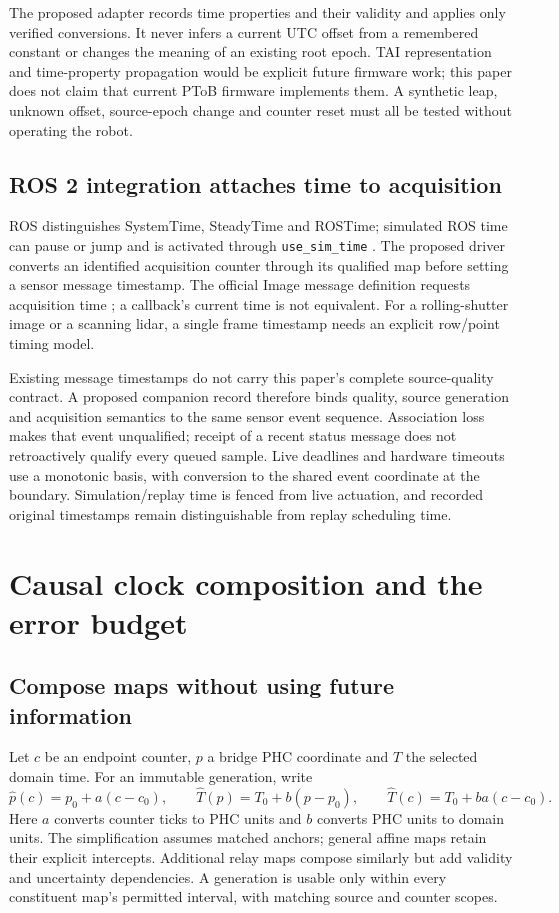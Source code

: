 \documentclass[11pt,letterpaper]{article}
\newcommand{\code}[1]{\texttt{#1}}
\begin{document}
The proposed adapter records time properties and their validity and applies only verified conversions. It never infers a current UTC offset from a remembered constant or changes the meaning of an existing root epoch. TAI representation and time-property propagation would be explicit future firmware work; this paper does not claim that current PToB firmware implements them. A synthetic leap, unknown offset, source-epoch change and counter reset must all be tested without operating the robot.

\subsection{ROS 2 integration attaches time to acquisition}
ROS distinguishes SystemTime, SteadyTime and ROSTime; simulated ROS time can pause or jump and is activated through \code{use\_sim\_time} \cite{rosclock}. The proposed driver converts an identified acquisition counter through its qualified map before setting a sensor message timestamp. The official Image message definition requests acquisition time \cite{rosimage}; a callback's current time is not equivalent. For a rolling-shutter image or a scanning lidar, a single frame timestamp needs an explicit row/point timing model.

Existing message timestamps do not carry this paper's complete source-quality contract. A proposed companion record therefore binds quality, source generation and acquisition semantics to the same sensor event sequence. Association loss makes that event unqualified; receipt of a recent status message does not retroactively qualify every queued sample. Live deadlines and hardware timeouts use a monotonic basis, with conversion to the shared event coordinate at the boundary. Simulation/replay time is fenced from live actuation, and recorded original timestamps remain distinguishable from replay scheduling time.

\section{Causal clock composition and the error budget}\label{sec:budget}
\subsection{Compose maps without using future information}
Let $c$ be an endpoint counter, $p$ a bridge PHC coordinate and $T$ the selected domain time. For an immutable generation, write
\begin{equation}
 \widehat p(c)=p_0+a(c-c_0),\qquad
 \widehat T(p)=T_0+b(p-p_0),\qquad
 \widehat T(c)=T_0+ba(c-c_0).
 \label{eq:compose}
\end{equation}
Here $a$ converts counter ticks to PHC units and $b$ converts PHC units to domain units. The simplification assumes matched anchors; general affine maps retain their explicit intercepts. Additional relay maps compose similarly but add validity and uncertainty dependencies. A generation is usable only within every constituent map's permitted interval, with matching source and counter scopes.
\end{document}

